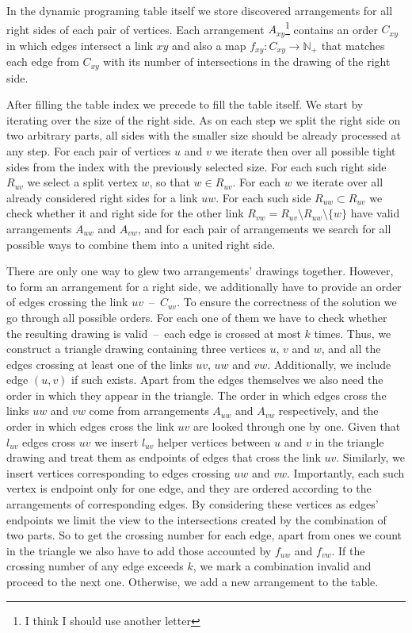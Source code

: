 In the dynamic programing table itself we store discovered arrangements for all right sides of each pair of vertices. Each arrangement \(A_{xy}\)\footnote{I think I should use another letter} contains an order \(C_{xy}\) in which edges intersect a link \(xy\) and also a map \(f_{xy}:C_{xy}\rightarrow \mathbb{N}_+\) that matches each edge from \(C_{xy}\) with its number of intersections in the drawing of the right side.

After filling the table index we precede to fill the table itself. We start by iterating over the size of the right side. As on each step we split the right side on two arbitrary parts, all sides with the smaller size should be already processed at any step. For each pair of vertices \(u\) and \(v\) we iterate then over all possible tight sides from the index with the previously selected size. For each such right side \(R_{uv}\) we select a split vertex \(w\), so that \(w \in R_{uv}\). For each \(w\) we iterate over all already considered right sides for a link \(uw\). For each such side \(R_{uw} \subset R_{uv}\) we check whether it and right side for the other link \(R_{vw} = R_{uv} \setminus R_{uw} \setminus \{w\}\) have valid arrangements \(A_{uw}\) and \(A_{vw}\), and for each pair of arrangements we search for all possible ways to combine them into a united right side.

There are only one way to glew two arrangements' drawings together. However, to form an arrangement for a right side, we additionally have to provide an order of edges crossing the link \(uv\)~--~\(C_{uv}\). To ensure the correctness of the solution we go through all possible orders. For each one of them we have to check whether the resulting drawing is valid~--~each edge is crossed at most \(k\) times. Thus, we construct a triangle drawing containing three vertices \(u\), \(v\) and \(w\), and all the edges crossing at least one of the links \(uv\), \(uw\) and \(vw\). Additionally, we include edge \((u, v)\) if such exists. Apart from the edges themselves we also need the order in which they appear in the triangle. The order in which edges cross the links \(uw\) and \(vw\) come from arrangements \(A_{uw}\) and \(A_{vw}\) respectively, and the order in which edges cross the link \(uv\) are looked through one by one. Given that \(l_{uv}\) edges cross \(uv\) we insert \(l_{uv}\) helper vertices between \(u\) and \(v\) in the triangle drawing and treat them as endpoints of edges that cross the link \(uv\). Similarly, we insert vertices corresponding to edges crossing \(uw\) and \(vw\). Importantly, each such vertex is endpoint only for one edge, and they are ordered according to the arrangements of corresponding edges. By considering these vertices as edges' endpoints we limit the view to the intersections created by the combination of two parts. So to get the crossing number for each edge, apart from ones we count in the triangle we also have to add those accounted by \(f_{uw}\) and \(f_{vw}\). If the crossing number of any edge exceeds \(k\), we mark a combination invalid and proceed to the next one. Otherwise, we add a new arrangement to the table.


